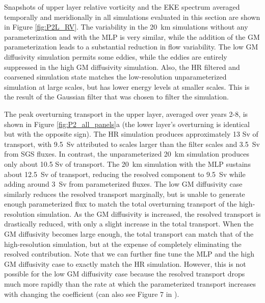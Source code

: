 \documentclass[draft]{agujournal2019}
\begin{document}
Snapshots of upper layer relative vorticity and the EKE spectrum averaged temporally and meridionally in all simulations evaluated in this section are shown in Figure \ref{fig:P2L_RV}. The variability in the 20~km simulations without any parameterization and with the MLP is very similar, while the addition of the GM parameterization leads to a substantial reduction in flow variability. The low GM diffusivity simulation permits some eddies, while the eddies are entirely suppressed in the high GM diffusivity simulation. Also, the HR filtered and coarsened simulation state matches the low-resolution unparameterized simulation at large scales, but has lower energy levels at smaller scales. This is the result of the Gaussian filter that was chosen to filter the simulation.


The peak overturning transport in the upper layer, averaged over years 2-8, is shown in Figure \ref{fig:P2_all_panels}a (the lower layer's overturning is identical but with the opposite sign). The HR simulation produces approximately 13 Sv of transport, with 9.5~Sv attributed to scales larger than the filter scales and 3.5~Sv from SGS fluxes. In contrast, the unparameterized 20~km simulation produces only about 10.5 Sv of transport. The 20~km simulation with the MLP sustains about 12.5~Sv of transport, reducing the resolved component to 9.5~Sv while adding around 3~Sv from parameterized fluxes. The low GM diffusivity case similarly reduces the resolved transport marginally, but is unable to generate enough parameterized flux to match the total overturning transport of the high-resolution simulation. As the GM diffusivity is increased, the resolved transport is drastically reduced, with only a slight increase in the total transport. When the GM diffusivity becomes large enough, the total transport can match that of the high-resolution simulation, but at the expense of completely eliminating the resolved contribution. Note that we can further fine tune the MLP and the high GM diffusivity case to exactly match the HR simulation. However, this is not possible for the low GM diffusivity case because the resolved transport drops much more rapidly than the rate at which the parameterized transport increases with changing the coefficient (can also see Figure 7 in ). 
\end{document}
